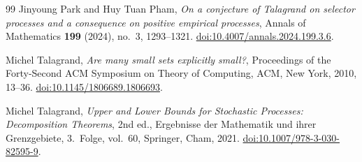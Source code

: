 \begin{thebibliography}{99}
Jinyoung Park and Huy Tuan Pham,
\emph{On a conjecture of Talagrand on selector processes and a consequence
on positive empirical processes},
Annals of Mathematics \textbf{199} (2024), no.~3, 1293--1321.
\href{https://doi.org/10.4007/annals.2024.199.3.6}{doi:10.4007/annals.2024.199.3.6}.

Michel Talagrand,
\emph{Are many small sets explicitly small?},
Proceedings of the Forty-Second ACM Symposium on Theory of Computing,
ACM, New York, 2010, 13--36.
\href{https://doi.org/10.1145/1806689.1806693}{doi:10.1145/1806689.1806693}.

Michel Talagrand,
\emph{Upper and Lower Bounds for Stochastic Processes:
Decomposition Theorems},
2nd ed., Ergebnisse der Mathematik und ihrer Grenzgebiete, 3.~Folge,
vol.~60, Springer, Cham, 2021.
\href{https://doi.org/10.1007/978-3-030-82595-9}{doi:10.1007/978-3-030-82595-9}.

\end{thebibliography}
